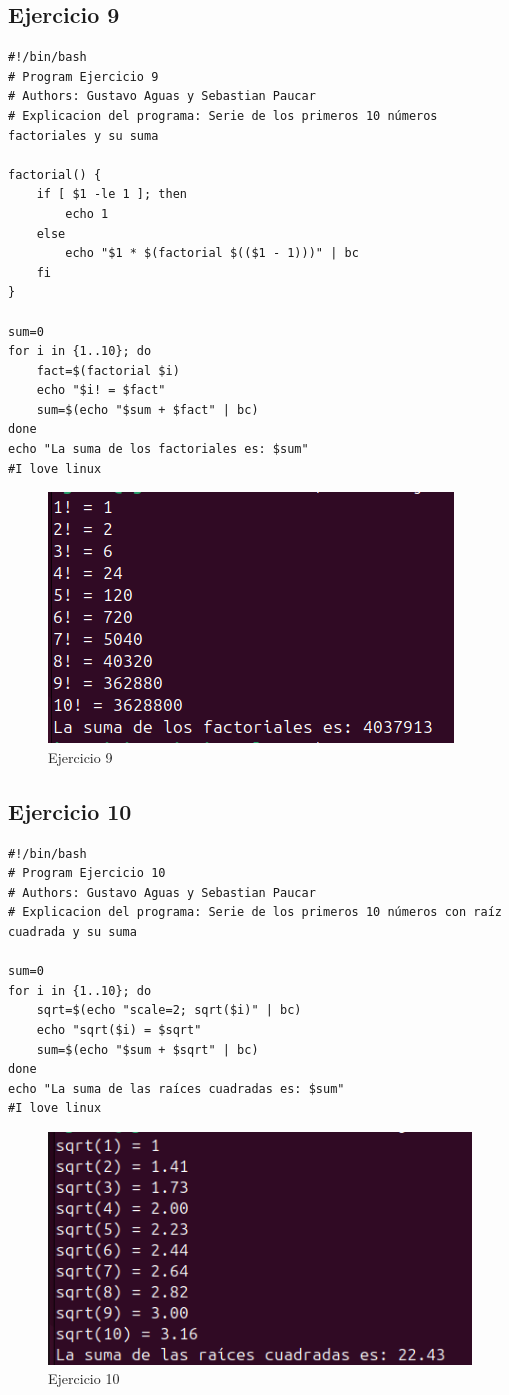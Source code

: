 \documentclass[11pt,twoside]{book}
\begin{document}
\subsection{Ejercicio 9}
\begin{lstlisting}
#!/bin/bash
# Program Ejercicio 9
# Authors: Gustavo Aguas y Sebastian Paucar
# Explicacion del programa: Serie de los primeros 10 números factoriales y su suma

factorial() {
    if [ $1 -le 1 ]; then
        echo 1
    else
        echo "$1 * $(factorial $(($1 - 1)))" | bc
    fi
}

sum=0
for i in {1..10}; do
    fact=$(factorial $i)
    echo "$i! = $fact"
    sum=$(echo "$sum + $fact" | bc)
done
echo "La suma de los factoriales es: $sum"
#I love linux
\end{lstlisting}
\begin{figure}
    \centering
    \includegraphics[width=0.75\linewidth]{series/ej9.png}
    \caption{Ejercicio 9}
\end{figure}
\newpage
\subsection{Ejercicio 10}

\begin{lstlisting}
#!/bin/bash
# Program Ejercicio 10
# Authors: Gustavo Aguas y Sebastian Paucar
# Explicacion del programa: Serie de los primeros 10 números con raíz cuadrada y su suma

sum=0
for i in {1..10}; do
    sqrt=$(echo "scale=2; sqrt($i)" | bc)
    echo "sqrt($i) = $sqrt"
    sum=$(echo "$sum + $sqrt" | bc)
done
echo "La suma de las raíces cuadradas es: $sum"
#I love linux
\end{lstlisting}
\begin{figure}
    \centering
    \includegraphics[width=0.75\linewidth]{series/ej10.png}
    \caption{Ejercicio 10}
\end{figure}
\end{document}
